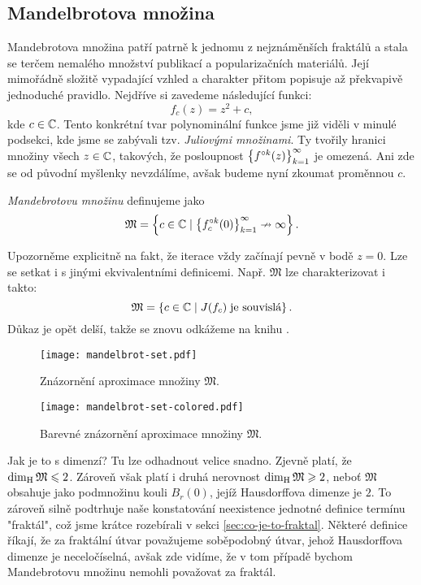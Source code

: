 \subsection{Mandelbrotova množina}\label{subsec:mandebrotova-mnozina}

Mandebrotova množina patří patrně k jednomu z nejznáměnších fraktálů a stala se terčem nemalého množství publikací a popularizačních materiálů. Její mimořádně složitě vypadající vzhled a charakter přitom popisuje až překvapivě jednoduché pravidlo. Nejdříve si zavedeme následující funkci:
\[f_c(z)=z^2+c,\]
kde $c\in\mathbb{C}$. Tento konkrétní tvar polynominální funkce jsme již viděli v minulé podsekci, kde jsme se zabývali tzv. \emph{Juliovými množinami}. Ty tvořily hranici množiny všech $z\in\mathbb{C}$, takových, že posloupnost $\left\{f^{\circ k}(z)\right\}_{k=1}^\infty$ je omezená. Ani zde se od původní myšlenky nevzdálíme, avšak budeme nyní zkoumat proměnnou $c$.
\begin{definition}\label{def:mandebrotova-mnozina}
    \emph{Mandebrotovu množinu} definujeme jako
    \[\mathfrak{M}=\left\{c\in\mathbb{C}\mid \left\{f_c^{\circ k}(0)\right\}_{k=1}^\infty\nrightarrow\infty\right\}.\]
\end{definition}
Upozorněme explicitně na fakt, že iterace vždy začínají pevně v bodě $z=0$. Lze se setkat i s jinými ekvivalentními definicemi. Např. $\mathfrak{M}$ lze charakterizovat i takto:
\[\mathfrak{M}=\left\{c\in\mathbb{C}\mid J(f_c)\;\text{je souvislá}\right\}.\]
Důkaz je opět delší, takže se znovu odkážeme na knihu \citep[str. 245]{Falconer1989}.
\begin{figure}[h]
    \centering
    \texttt{[image: mandelbrot-set.pdf]}
    \caption{Znázornění aproximace množiny $\mathfrak{M}$.}
    \label{fig:znazorneni-mandebrotovy-mnoziny}
\end{figure}
\begin{figure}[h]
    \centering
    \texttt{[image: mandelbrot-set-colored.pdf]}
    \caption{Barevné znázornění aproximace množiny $\mathfrak{M}$.}
    \label{fig:znazorneni-mandebrotovy-mnoziny-vybarveno}
\end{figure}
Jak je to s dimenzí? Tu lze odhadnout velice snadno. Zjevně platí, že $\operatorname{dim_H}{\mathfrak{M}}\leqslant 2$. Zároveň však platí i druhá nerovnost $\operatorname{dim_H}{\mathfrak{M}}\geqslant 2$, neboť $\mathfrak{M}$ obsahuje jako podmnožinu kouli $B_r(0)$, jejíž Hausdorffova dimenze je $2$. To zároveň silně podtrhuje naše konstatování neexistence jednotné definice termínu "fraktál", což jsme krátce rozebírali v sekci \ref{sec:co-je-to-fraktal}. Některé definice říkají, že za fraktální útvar považujeme soběpodobný útvar, jehož Hausdorffova dimenze je neceločíselná, avšak zde vidíme, že v tom případě bychom Mandebrotovu množinu nemohli považovat za fraktál.